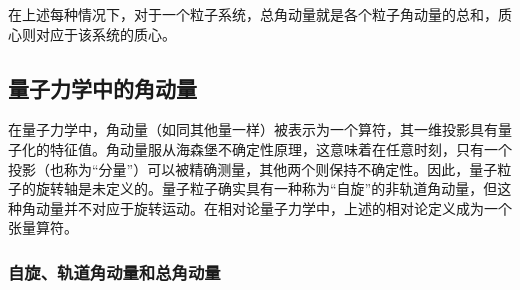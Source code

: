 在上述每种情况下，对于一个粒子系统，总角动量就是各个粒子角动量的总和，质心则对应于该系统的质心。
\subsection{量子力学中的角动量} 
在量子力学中，角动量（如同其他量一样）被表示为一个算符，其一维投影具有量子化的特征值。角动量服从海森堡不确定性原理，这意味着在任意时刻，只有一个投影（也称为“分量”）可以被精确测量，其他两个则保持不确定性。因此，量子粒子的旋转轴是未定义的。量子粒子确实具有一种称为“自旋”的非轨道角动量，但这种角动量并不对应于旋转运动。在相对论量子力学中，上述的相对论定义成为一个张量算符。
\subsubsection{自旋、轨道角动量和总角动量}  
